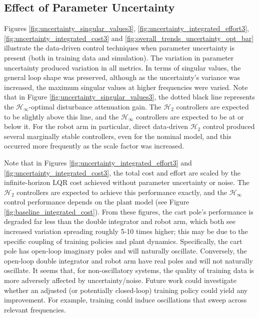 \subsection{Effect of Parameter Uncertainty}
Figures \ref{fig:uncertainty_singular_values3}, \ref{fig:uncertainty_integrated_effort3}, \ref{fig:uncertainty_integrated_cost3} and \ref{fig:overall_trends_uncertainty_opt_bar} illustrate the data-driven control techniques when parameter uncertainty is present (both in training data and simulation).  The variation in parameter uncertainty produced variation in all metrics.  In terms of singular values, the general loop shape was preserved, although as the uncertainty's variance was increased, the maximum singular values at higher frequencies were varied.  Note that in Figure \ref{fig:uncertainty_singular_values3}, the dotted black line represents the $\mathcal{H}_{\infty}$-optimal disturbance attenuation gain.  The $\mathcal{H}_{2}$ controllers are expected to be slightly above this line, and the $\mathcal{H}_{\infty}$ controllers are expected to be at or below it.  For the robot arm in particular, direct data-driven $\mathcal{H}_{2}$ control produced several marginally stable controllers, even for the nominal model, and this occurred more frequently as the scale factor was increased.

Note that in Figures \ref{fig:uncertainty_integrated_effort3} and \ref{fig:uncertainty_integrated_cost3}, the total cost and effort are scaled by the infinite-horizon LQR cost achieved without parameter uncertainty or noise.  The $\mathcal{H}_{2}$ controllers are expected to achieve this performance exactly, and the $\mathcal{H}_{\infty}$ control performance depends on the plant model (see Figure \ref{fig:baseline_integrated_cost}).  From these figures, the cart pole's performance is degraded far less than the double integrator and robot arm, which both see increased variation spreading roughly 5-10 times higher; this may be due to the specific coupling of training policies and plant dynamics.  Specifically, the cart pole has open-loop imaginary poles and will naturally oscillate.  Conversely, the open-loop double integrator and robot arm have real poles and will not naturally oscillate.  It seems that, for non-oscillatory systems, the quality of training data is more adversely affected by uncertainty/noise.  Future work could investigate whether an adjusted (or potentially closed-loop) training policy could yield any improvement.  For example, training could induce oscillations that sweep across relevant frequencies.

